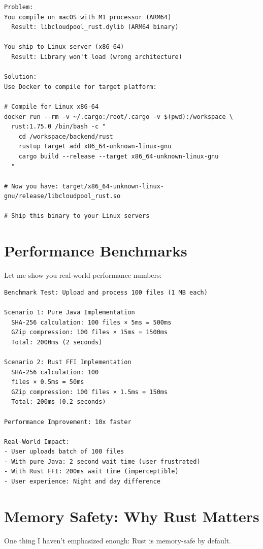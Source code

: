 \documentclass[11pt,a4paper]{report}
\begin{document}
\begin{lstlisting}[language=text]
Problem:
You compile on macOS with M1 processor (ARM64)
  Result: libcloudpool_rust.dylib (ARM64 binary)

You ship to Linux server (x86-64)
  Result: Library won't load (wrong architecture)

Solution:
Use Docker to compile for target platform:

# Compile for Linux x86-64
docker run --rm -v ~/.cargo:/root/.cargo -v $(pwd):/workspace \
  rust:1.75.0 /bin/bash -c "
    cd /workspace/backend/rust
    rustup target add x86_64-unknown-linux-gnu
    cargo build --release --target x86_64-unknown-linux-gnu
  "

# Now you have: target/x86_64-unknown-linux-gnu/release/libcloudpool_rust.so

# Ship this binary to your Linux servers
\end{lstlisting}


\chapter{Performance Benchmarks}


Let me show you real-world performance numbers:

\begin{lstlisting}[language=text]
Benchmark Test: Upload and process 100 files (1 MB each)

Scenario 1: Pure Java Implementation
  SHA-256 calculation: 100 files × 5ms = 500ms
  GZip compression: 100 files × 15ms = 1500ms
  Total: 2000ms (2 seconds)

Scenario 2: Rust FFI Implementation
  SHA-256 calculation: 100 
  files × 0.5ms = 50ms
  GZip compression: 100 files × 1.5ms = 150ms
  Total: 200ms (0.2 seconds)

Performance Improvement: 10x faster

Real-World Impact:
- User uploads batch of 100 files
- With pure Java: 2 second wait time (user frustrated)
- With Rust FFI: 200ms wait time (imperceptible)
- User experience: Night and day difference
\end{lstlisting}


\chapter{Memory Safety: Why Rust Matters}


One thing I haven't emphasized enough: Rust is memory-safe by default.
\end{document}
